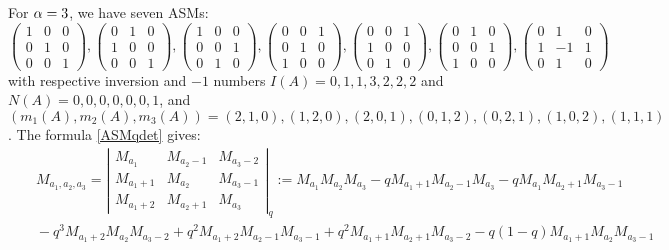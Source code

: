 \begin{example}
For ${\alpha}=3$, we have seven ASMs:
$$ \begin{pmatrix} 1 & 0 & 0\\ 0 & 1 & 0\\ 0& 0& 1\end{pmatrix},
\begin{pmatrix} 0 & 1 & 0\\ 1 & 0 & 0\\ 0& 0& 1\end{pmatrix},
\begin{pmatrix} 1 & 0 & 0\\ 0 & 0 & 1\\ 0& 1& 0\end{pmatrix},
\begin{pmatrix} 0 & 0 & 1\\ 0 & 1 & 0\\ 1& 0& 0\end{pmatrix},
\begin{pmatrix} 0 & 0 & 1\\ 1 & 0 & 0\\ 0& 1& 0\end{pmatrix},
\begin{pmatrix} 0 & 1 & 0\\ 0 & 0 & 1\\ 1& 0& 0\end{pmatrix},
\begin{pmatrix} 0 & 1 & 0\\ 1 & -1 & 1\\ 0& 1& 0\end{pmatrix}
$$
with respective inversion and $-1$ numbers $I(A)=0,1,1,3,2,2,2$ and $N(A)=0,0,0,0,0,0,1$,
and $(m_1(A),m_2(A),m_3(A))=(2,1,0),(1,2,0),(2,0,1),(0,1,2),(0,2,1),(1,0,2),(1,1,1)$.
The formula \eqref{ASMqdet} gives:
\begin{eqnarray*}&&\!\!\!\!\!\!\!\!\!\!\! M_{a_1,a_2,a_3}=\left\vert \begin{matrix}
M_{a_1} & M_{a_2-1}& M_{a_3-2}\\ 
M_{a_1+1} & M_{a_2}& M_{a_3-1}\\
M_{a_1+2} & M_{a_2+1}& M_{a_3}
\end{matrix}\right\vert_q
:=M_{a_1}M_{a_2}M_{a_3}-qM_{a_1+1}M_{a_2-1}M_{a_3}-qM_{a_1}M_{a_2+1}M_{a_3-1}\\
&&\!\!\!\!\!\!\!\!\!\!\!  -q^3 M_{a_1+2}M_{a_2}M_{a_3-2}+ q^2 M_{a_1+2}M_{a_2-1}M_{a_3-1}
+q^2 M_{a_1+1}M_{a_2+1}M_{a_3-2}-q(1-q)M_{a_1+1}M_{a_2}M_{a_3-1}
\end{eqnarray*}
\end{example}

